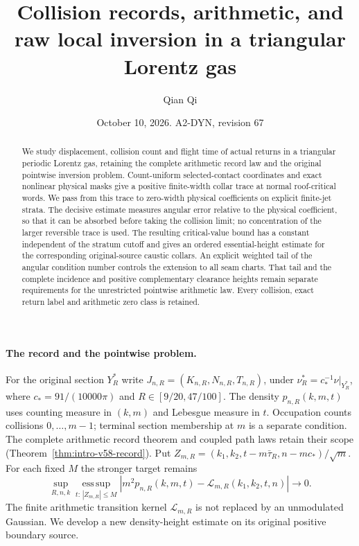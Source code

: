 \documentclass[11pt,reqno]{amsart}
\title[Collision records and raw local inversion]{Collision records, arithmetic, and raw local inversion in a triangular Lorentz gas}
\author{Qian Qi}
\date{October 10, 2026. A2-DYN, revision 67}
\numberwithin{equation}{section}
\theoremstyle{definition}\newtheorem{definition}[theorem]{Definition}
\theoremstyle{remark}\newtheorem{remark}[theorem]{Remark}
\begin{document}
\raggedbottom
\begin{abstract}
We study displacement, collision count and flight time of actual returns
in a triangular periodic Lorentz gas, retaining the complete arithmetic
record law and the original pointwise inversion problem. Count-uniform
selected-contact coordinates and exact nonlinear physical masks give a
positive finite-width collar trace at normal roof-critical words.
We pass from this trace to zero-width physical coefficients on explicit
finite-jet strata. The decisive estimate measures angular error relative
to the physical coefficient, so that it can be absorbed before taking the
collision limit; no concentration of the larger reversible trace is used.
The resulting critical-value bound has a constant independent of the
stratum cutoff and gives an ordered essential-height estimate for the
corresponding original-source caustic collars. An explicit weighted tail
of the angular condition number controls the extension to all seam charts.
That tail and the complete incidence and positive complementary clearance
heights remain separate requirements for the unrestricted pointwise
arithmetic law. Every collision, exact return label and arithmetic zero
class is retained.
\end{abstract}
\maketitle

\paragraph{The record and the pointwise problem.}
For the original section $Y_R^*$ write
$J_{n,R}=(K_{n,R},N_{n,R},T_{n,R})$, under
$\nu_R^*=c_*^{-1}\nu|_{Y_R^*}$, where
$c_*=91/(10000\pi)$ and $R\in[9/20,47/100]$.
The density $p_{n,R}(k,m,t)$ uses counting measure in $(k,m)$ and
Lebesgue measure in $t$. Occupation counts collisions $0,\ldots,m-1$;
terminal section membership at $m$ is a separate condition.
The complete arithmetic record theorem and coupled path laws retain
their scope (Theorem~\ref{thm:intro-v58-record}). Put
$Z_{m,R}=(k_1,k_2,t-m\bar\tau_R,n-mc_*)/\sqrt m$.
For each fixed $M$ the stronger target remains
\[
 \sup_{R,n,k}\operatorname*{ess\,sup}_{t:\,|Z_{m,R}|\le M}
 \left|m^2p_{n,R}(k,m,t)-\mathcal L_{m,R}(k_1,k_2,t,n)\right|
                         \longrightarrow0.
\]
The finite arithmetic transition kernel $\mathcal L_{m,R}$ is not
replaced by an unmodulated Gaussian. We develop a new density-height
estimate on its original positive boundary source.
\end{document}
